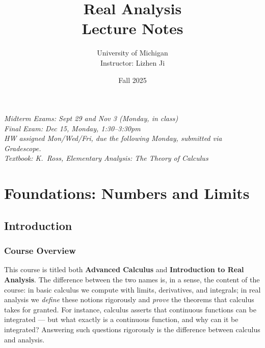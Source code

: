 \documentclass[11pt]{report}
\title{\textbf{Real Analysis} \\ \large Lecture Notes}
\author{University of Michigan \\ \normalsize Instructor: Lizhen Ji}
\date{Fall 2025}
\begin{document}
\maketitle

\begin{center}
\textit{Midterm Exams: Sept 29 and Nov 3 (Monday, in class)} \\
\textit{Final Exam: Dec 15, Monday, 1:30--3:30pm} \\[0.5em]
\textit{HW assigned Mon/Wed/Fri, due the following Monday, submitted via Gradescope.} \\
\textit{Textbook: K.~Ross, \textit{Elementary Analysis: The Theory of Calculus}}
\end{center}

\tableofcontents
\newpage


\part{Foundations: Numbers and Limits}


\chapter{Introduction}

\section*{Course Overview}

This course is titled both \textbf{Advanced Calculus} and \textbf{Introduction to Real Analysis}. The difference between the two names is, in a sense, the content of the course: in basic calculus we compute with limits, derivatives, and integrals; in real analysis we \emph{define} these notions rigorously and \emph{prove} the theorems that calculus takes for granted. For instance, calculus asserts that continuous functions can be integrated --- but what exactly is a continuous function, and why can it be integrated? Answering such questions rigorously is the difference between calculus and analysis.
\end{document}
